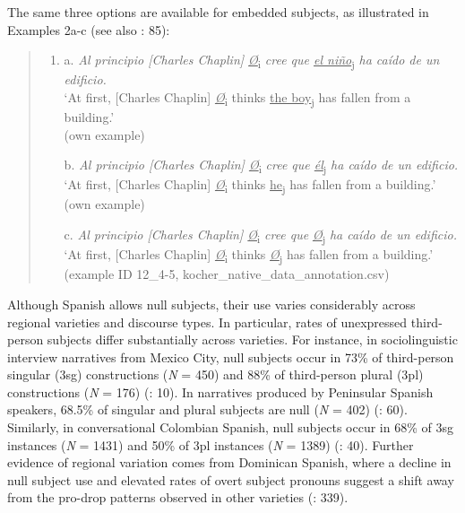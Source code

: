 \documentclass[
  letterpaper,
  DIV=11,
  numbers=noendperiod]{scrartcl}
\begin{document}
The same three options are available for embedded subjects, as
illustrated in Examples 2a-c (see also : 85):

\begin{quote}
\begin{enumerate}
\def\labelenumi{(\arabic{enumi})}
\setcounter{enumi}{1}
\item
  a. \emph{Al principio {[}Charles Chaplin{]} \ul{Ø}}\textsubscript{i}
  \emph{cree que \ul{el niño}}\textsubscript{j} \emph{ha caído de un
  edificio.}\\
  `At first, {[}Charles Chaplin{]} \ul{\emph{Ø}}\textsubscript{i} thinks
  \ul{the boy}\textsubscript{j} has fallen from a building.'\\
  (own example)

  b. \emph{Al principio {[}Charles Chaplin{]} \ul{Ø}}\textsubscript{i}
  \emph{cree que \ul{él}}\textsubscript{j} \emph{ha caído de un
  edificio.}\\
  `At first, {[}Charles Chaplin{]} \ul{\emph{Ø}}\textsubscript{i} thinks
  \ul{he}\textsubscript{j} has fallen from a building.'\\
  (own example)

  c. \emph{Al principio {[}Charles Chaplin{]} \ul{Ø}}\textsubscript{i}
  \emph{cree que} \ul{\emph{Ø}}\textsubscript{j} \emph{ha caído de un
  edificio.}\\
  `At first, {[}Charles Chaplin{]} \ul{\emph{Ø}}\textsubscript{i} thinks
  \ul{\emph{Ø}}\textsubscript{j} has fallen from a building.'\\
  (example ID 12\_4-5, kocher\_native\_data\_annotation.csv)
\end{enumerate}
\end{quote}

Although Spanish allows null subjects, their use varies considerably
across regional varieties and discourse types. In particular, rates of
unexpressed third-person subjects differ substantially across varieties.
For instance, in sociolinguistic interview narratives from Mexico City,
null subjects occur in 73\% of third-person singular (3sg) constructions
(\emph{N} = 450) and 88\% of third-person plural (3pl) constructions
(\emph{N} = 176) (: 10). In narratives produced by Peninsular Spanish
speakers, 68.5\% of singular and plural subjects are null (\emph{N} =
402) (: 60). Similarly, in
conversational Colombian Spanish, null subjects occur in 68\% of 3sg
instances (\emph{N} = 1431) and 50\% of 3pl instances (\emph{N} = 1389)
(: 40). Further evidence of regional variation comes from
Dominican Spanish, where a decline in null subject use and elevated
rates of overt subject pronouns suggest a shift away from the pro-drop
patterns observed in other varieties
(: 339).
\end{document}
